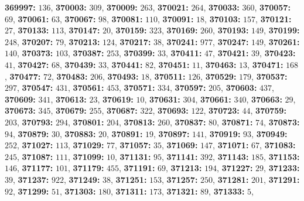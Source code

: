\textsf{\bfseries 369997:} $136$, \textsf{\bfseries 370003:} $309$, \textsf{\bfseries 370009:} $263$, \textsf{\bfseries 370021:} $264$, \textsf{\bfseries 370033:} $360$, \textsf{\bfseries 370057:} $69$, \textsf{\bfseries 370061:} $63$, \textsf{\bfseries 370067:} $98$, \textsf{\bfseries 370081:} $110$, \textsf{\bfseries 370091:} $18$, \textsf{\bfseries 370103:} $157$, \textsf{\bfseries 370121:} $27$, \textsf{\bfseries 370133:} $113$, \textsf{\bfseries 370147:} $20$, \textsf{\bfseries 370159:} $323$, \textsf{\bfseries 370169:} $260$, \textsf{\bfseries 370193:} $149$, \textsf{\bfseries 370199:} $248$, \textsf{\bfseries 370207:} $79$, \textsf{\bfseries 370213:} $124$, \textsf{\bfseries 370217:} $38$, \textsf{\bfseries 370241:} $977$, \textsf{\bfseries 370247:} $149$, \textsf{\bfseries 370261:} $140$, \textsf{\bfseries 370373:} $103$, \textsf{\bfseries 370387:} $253$, \textsf{\bfseries 370399:} $33$, \textsf{\bfseries 370411:} $47$, \textsf{\bfseries 370421:} $39$, \textsf{\bfseries 370423:} $41$, \textsf{\bfseries 370427:} $68$, \textsf{\bfseries 370439:} $33$, \textsf{\bfseries 370441:} $82$, \textsf{\bfseries 370451:} $11$, \textsf{\bfseries 370463:} $13$, \textsf{\bfseries 370471:} $168$, \textsf{\bfseries 370477:} $72$, \textsf{\bfseries 370483:} $206$, \textsf{\bfseries 370493:} $18$, \textsf{\bfseries 370511:} $126$, \textsf{\bfseries 370529:} $179$, \textsf{\bfseries 370537:} $297$, \textsf{\bfseries 370547:} $431$, \textsf{\bfseries 370561:} $453$, \textsf{\bfseries 370571:} $334$, \textsf{\bfseries 370597:} $205$, \textsf{\bfseries 370603:} $437$, \textsf{\bfseries 370609:} $341$, \textsf{\bfseries 370613:} $23$, \textsf{\bfseries 370619:} $10$, \textsf{\bfseries 370631:} $304$, \textsf{\bfseries 370661:} $340$, \textsf{\bfseries 370663:} $29$, \textsf{\bfseries 370673:} $345$, \textsf{\bfseries 370679:} $255$, \textsf{\bfseries 370687:} $322$, \textsf{\bfseries 370693:} $122$, \textsf{\bfseries 370723:} $44$, \textsf{\bfseries 370759:} $203$, \textsf{\bfseries 370793:} $294$, \textsf{\bfseries 370801:} $204$, \textsf{\bfseries 370813:} $260$, \textsf{\bfseries 370837:} $80$, \textsf{\bfseries 370871:} $74$, \textsf{\bfseries 370873:} $94$, \textsf{\bfseries 370879:} $30$, \textsf{\bfseries 370883:} $20$, \textsf{\bfseries 370891:} $19$, \textsf{\bfseries 370897:} $141$, \textsf{\bfseries 370919:} $93$, \textsf{\bfseries 370949:} $252$, \textsf{\bfseries 371027:} $113$, \textsf{\bfseries 371029:} $77$, \textsf{\bfseries 371057:} $35$, \textsf{\bfseries 371069:} $147$, \textsf{\bfseries 371071:} $67$, \textsf{\bfseries 371083:} $245$, \textsf{\bfseries 371087:} $111$, \textsf{\bfseries 371099:} $10$, \textsf{\bfseries 371131:} $95$, \textsf{\bfseries 371141:} $392$, \textsf{\bfseries 371143:} $185$, \textsf{\bfseries 371153:} $146$, \textsf{\bfseries 371177:} $101$, \textsf{\bfseries 371179:} $455$, \textsf{\bfseries 371191:} $69$, \textsf{\bfseries 371213:} $194$, \textsf{\bfseries 371227:} $29$, \textsf{\bfseries 371233:} $39$, \textsf{\bfseries 371237:} $922$, \textsf{\bfseries 371249:} $38$, \textsf{\bfseries 371251:} $153$, \textsf{\bfseries 371257:} $250$, \textsf{\bfseries 371281:} $201$, \textsf{\bfseries 371291:} $92$, \textsf{\bfseries 371299:} $51$, \textsf{\bfseries 371303:} $180$, \textsf{\bfseries 371311:} $173$, \textsf{\bfseries 371321:} $89$, \textsf{\bfseries 371333:} $5$, 

